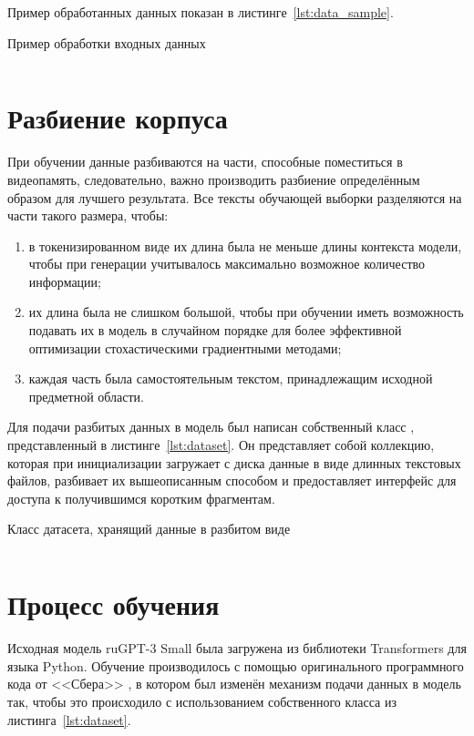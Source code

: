 Пример обработанных данных показан в листинге \ref*{lst:data_sample}.

\begin{listing}[H]
    \caption{Пример обработки входных данных}
    \inputminted[linenos=true]{text}{../inc/code/text_sample.txt}
    \label{lst:data_sample}
\end{listing}

\section{Разбиение корпуса}

При обучении данные разбиваются на части, способные поместиться в видеопамять, следовательно, важно производить разбиение определённым образом для лучшего результата. Все тексты обучающей выборки разделяются на части такого размера, чтобы:
\begin{enumerate}
    \item в токенизированном виде их длина была не меньше длины контекста модели, чтобы при генерации учитывалось максимально возможное количество информации;
    \item их длина была не слишком большой, чтобы при обучении иметь возможность подавать их в модель в случайном порядке для более эффективной оптимизации стохастическими градиентными методами;
    \item каждая часть была самостоятельным текстом, принадлежащим исходной предметной области.
\end{enumerate}

Для подачи разбитых данных в модель был написан собственный класс , представленный в листинге \ref*{lst:dataset}. Он представляет собой коллекцию, которая при инициализации загружает с диска данные в виде длинных текстовых файлов, разбивает их вышеописанным способом и предоставляет интерфейс для доступа к получившимся коротким фрагментам.

\begin{listing}[H]
    \caption{Класс датасета, хранящий данные в разбитом виде}
    \inputminted{python}{../inc/code/texts_dataset.py}
    \label{lst:dataset}
\end{listing}

\newpage
\section{Процесс обучения}

Исходная модель ruGPT-3 Small была загружена из библиотеки Transformers для языка Python. Обучение производилось с помощью оригинального программного кода от <<Сбера>> \cite{gh:sber}, в котором был изменён механизм подачи данных в модель так, чтобы это происходило с использованием собственного класса  из листинга \ref*{lst:dataset}.

